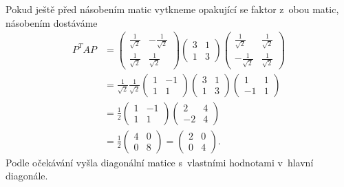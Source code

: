 Pokud ještě před násobením matic vytkneme opakující se faktor z obou matic, násobením dostáváme
\begin{equation*}
  \begin{aligned}
  P^TAP&=\begin{pmatrix}
      \frac 1{\sqrt 2} & -\frac 1{\sqrt 2}\\
      \frac {1}{\sqrt 2} & \frac 1{\sqrt 2}
    \end{pmatrix}
        \begin{pmatrix}
    3 & 1 \\ 1 &3
  \end{pmatrix}
  \begin{pmatrix}
      \frac 1{\sqrt 2} & \frac 1{\sqrt 2}\\
      -\frac {1}{\sqrt 2} & \frac 1{\sqrt 2}
    \end{pmatrix}\\&
    =\frac 1{\sqrt 2}\frac 1{\sqrt 2}
    \begin{pmatrix}
      1 & -1 \\ 1 &1
    \end{pmatrix}
        \begin{pmatrix}
    3 & 1 \\ 1 &3
  \end{pmatrix}
    \begin{pmatrix}
      1 & 1 \\ -1 &1
    \end{pmatrix}
    \\&=
    \frac 1{2}
    \begin{pmatrix}
      1 & -1 \\ 1 &1
    \end{pmatrix}
    \begin{pmatrix}
      2 & 4 \\-2 & 4
    \end{pmatrix}
    \\&=
    \frac 1{ 2}
    \begin{pmatrix}
      4& 0 \\ 0& 8
    \end{pmatrix}=
    \begin{pmatrix}
      2& 0 \\0& 4
    \end{pmatrix}.
  \end{aligned}
\end{equation*}
Podle očekávání vyšla diagonální matice s vlastními hodnotami v hlavní diagonále.
 \konec


